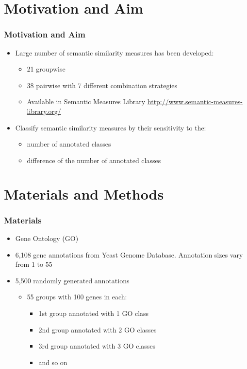 \documentclass{beamer}
\begin{document}

\section{Motivation and Aim}

\begin{frame}
\frametitle{Motivation and Aim}
\begin{itemize}
\item Large number of semantic similarity measures has been developed:
\begin{itemize}
\item 21 groupwise
\item 38 pairwise with 7 different combination strategies
\item Available in Semantic Measures Library \url{http://www.semantic-measures-library.org/}
\end{itemize}
\item Classify semantic similarity measures by their sensitivity to the:
\begin{itemize}
\item number of annotated classes
\item difference of the number of annotated classes
\end{itemize}
\end{itemize}
\end{frame}


\section{Materials and Methods}


\begin{frame}
\frametitle{Materials}
\begin{itemize}
\item Gene Ontology (GO)
\item 6,108 gene annotations from Yeast Genome Database. Annotation sizes vary from 1 to 55
\item 5,500 randomly generated annotations
\begin{itemize}
\item 55 groups with 100 genes in each:
\begin{itemize}
\item 1st group annotated with 1 GO class
\item 2nd group annotated with 2 GO classes
\item 3rd group annotated with 3 GO classes
\item and so on
\end{itemize}
\end{itemize}
\end{itemize}

\end{frame}
\end{document}
